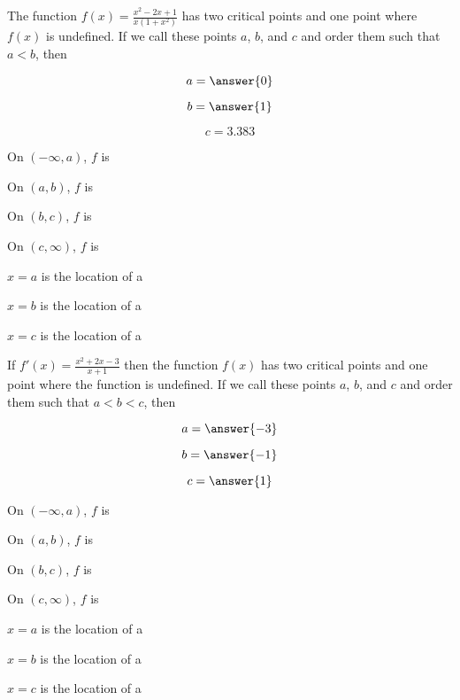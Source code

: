 \documentclass[handout]{ximera}
\begin{document}
\begin{exercise}
The function $f(x) =\frac{x^2-2x+1}{x(1+x^2)}$ has two critical
points and one point where $f(x)$ is undefined.  If we call these  points $a$, $b$, and $c$ and order them
such that $a < b$, then

$$
a = \answer{0}
$$

$$
b=\answer{1}
$$

$$
c=3.383
$$

On $(-\infty,a)$, $f$ is 

On $(a,b)$, $f$ is 

On $(b,c)$, $f$ is 

On $(c,\infty)$, $f$ is 

$x=a$ is the location of a 

$x=b$ is the location of a 

$x=c$ is the location of a 

\end{exercise}


\begin{exercise}
If $f'(x) =\frac{x^2+2x-3}{x+1}$ then the function $f(x)$ has two critical points and one point where the function is undefined.
If we call these points $a$, $b$, and $c$ and order them such
that $a < b < c$, then

$$
a = \answer{-3}
$$

$$
b=\answer{-1}
$$

$$
c=\answer{1}
$$



On $(-\infty,a)$, $f$ is 

On $(a,b)$, $f$ is 

On $(b,c)$, $f$ is 

On $(c,\infty)$, $f$ is 


$x=a$ is the location of a 

$x=b$ is the location of a 

$x=c$ is the location of a 

\end{exercise}
\end{document}
